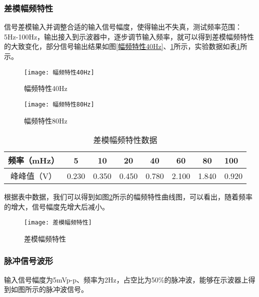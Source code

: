 \documentclass{zjureport}
\begin{document}
	\subsubsection{差模幅频特性}
	
	信号差模输入并调整合适的输入信号幅度，使得输出不失真，测试频率范围：5Hz-100Hz，输出接入到示波器中，逐步调节输入频率，就可以得到差模幅频特性的大致变化，部分信号输出结果如图\ref{幅频特性40Hz}、\ref{幅频特性80Hz}所示，实验数据如表\ref{差模幅频特性数据}所示。
	
	\begin{figure}[H]
		\centering
		\begin{minipage}[t]{0.49\linewidth}%
			\texttt{[image: 幅频特性40Hz]}%
			\caption{幅频特性40Hz}
			\label{幅频特性40Hz}
		\end{minipage}%
		\begin{minipage}[t]{0.49\linewidth}
			\texttt{[image: 幅频特性80Hz]}
			\caption{幅频特性80Hz}
			\label{幅频特性80Hz}
		\end{minipage}
	\end{figure}

	\begin{table}[htbp]
		\centering
		\begin{tabular}{ c c c c c c c p{1.5cm}}
			\hline
			频率（mHz） & 5 & 10 & 20 & 40 & 60 & 80 & 100  \\
			\hline
			峰峰值（V）  & 0.230 & 0.350 & 0.450 & 0.780 & 2.100 & 1.840 & 0.920 \\
			\hline
		\end{tabular}
		\caption{差模幅频特性数据}\label{差模幅频特性数据}
	\end{table}

	根据表中数据，我们可以得到如图\ref{差模幅频特性}所示的幅频特性曲线图，可以看出，随着频率的增大，信号幅度先增大后减小。
	
	\begin{figure}[h]
		\centering%
		\texttt{[image: 差模幅频特性]}
		\caption{差模幅频特性}%
		\label{差模幅频特性}%
	\end{figure}
	
	\subsubsection{脉冲信号波形}
	
	输入信号幅度为5mVp-p、频率为2Hz，占空比为50\%的脉冲波，能够在示波器上得到如图所示的脉冲波信号。
	
\end{document}
